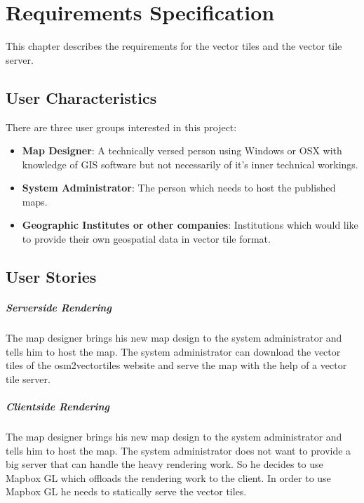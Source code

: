 \chapter{Requirements Specification}\label{requirements_specification}

This chapter describes the requirements for the vector tiles and the vector tile server.

\section{User Characteristics}\label{user_characteristics}

There are three user groups interested in this project:

\begin{itemize}
\item
  \textbf{Map Designer}: A technically versed person using Windows or
  OSX with knowledge of GIS software but not necessarily of it's
  inner technical workings.
\item
  \textbf{System Administrator}: The person which needs to host the
  published maps.
\item
  \textbf{Geographic Institutes or other companies}: Institutions which would like to provide their own geospatial data in vector tile format. 
\end{itemize}

\section{User Stories}\label{user_stories}
\paragraph{Serverside Rendering}
The map designer brings his new map design to the system administrator and tells him to host the map. The system administrator can download the vector tiles of the osm2vectortiles website and serve the map with the help of a vector tile server.

\paragraph{Clientside Rendering}
The map designer brings his new map design to the system administrator and tells him to host the map. The system administrator does not want to provide a big server that can handle the heavy rendering work. So he decides to use Mapbox GL\cite{rs_1_mapbox.com_2015} which offloads the rendering work to the client. In order to use Mapbox GL he needs to statically serve the vector tiles. 

